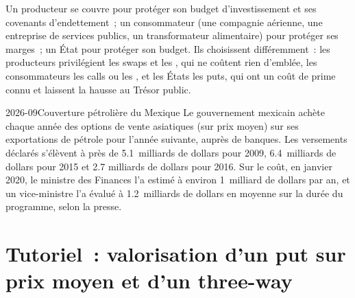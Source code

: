 Un producteur se couvre pour protéger son budget d'investissement et ses covenants d'endettement~; un consommateur (une compagnie aérienne, une
entreprise de services publics, un transformateur alimentaire) pour protéger ses marges~; un État pour protéger son budget. Ils choisissent
différemment~: les producteurs privilégient les swaps et les , qui ne coûtent rien d'emblée, les consommateurs les calls ou les , et les
États les puts, qui ont un coût de prime connu et laissent la hausse au Trésor public.

\begin{dated}{2026-09}{Couverture pétrolière du Mexique}\label{dat:m3:commodity-options-and-structured-hedges:mexico}
Le gouvernement mexicain achète chaque année des options de vente asiatiques (sur prix moyen) sur ses exportations de pétrole pour l'année
suivante, auprès de banques. Les versements déclarés s'élèvent à près de 5.1~milliards de dollars pour 2009, 6.4~milliards de dollars pour 2015 et 2.7
milliards de dollars pour 2016. Sur le coût, en janvier 2020, le ministre des Finances l'a estimé à environ 1~milliard de dollars par an, et un
vice-ministre l'a évalué à 1.2~milliards de dollars en moyenne sur la durée du programme, selon la presse.
\end{dated}

\section{Tutoriel~: valorisation d'un put sur prix moyen et d'un three-way}\label{tut:m3:commodity-options-and-structured-hedges:apo}

